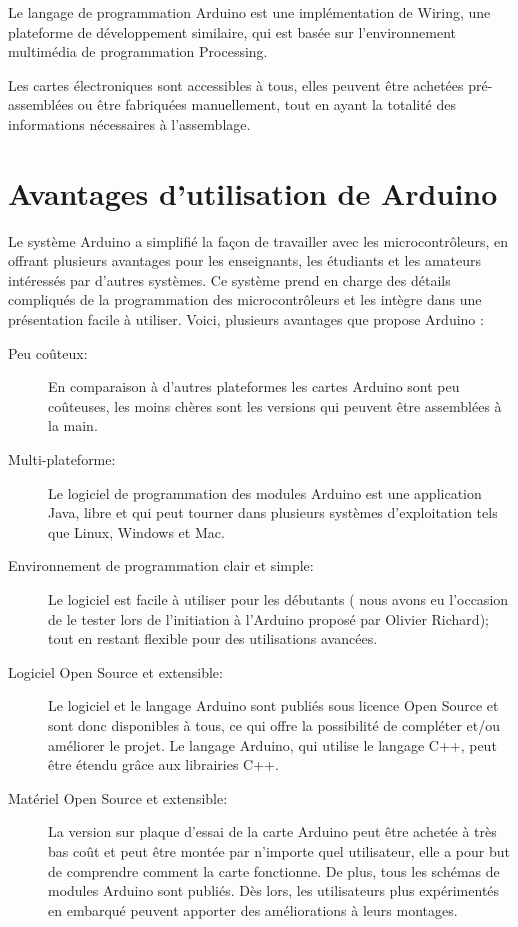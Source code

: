 Le langage de programmation Arduino est une implémentation de Wiring, une plateforme de développement similaire, qui est basée sur l'environnement
multimédia de programmation Processing.

Les cartes électroniques sont accessibles à tous, elles peuvent être achetées pré-assemblées ou être fabriquées manuellement, tout en ayant la totalité des
informations nécessaires à l'assemblage.

\section{Avantages d'utilisation de Arduino}

Le système Arduino a simplifié la façon de travailler avec les microcontrôleurs, en offrant plusieurs avantages pour les enseignants, les étudiants et
les amateurs intéressés par d'autres systèmes. Ce système prend en charge des détails compliqués de la programmation des microcontrôleurs et les intègre
dans une présentation facile à utiliser. Voici, plusieurs avantages que propose Arduino :

\begin{description}
 \item[Peu coûteux:] En comparaison à d'autres plateformes les cartes Arduino sont peu coûteuses, les moins chères sont les versions qui peuvent être
assemblées à la main.
 \item[Multi-plateforme:] Le logiciel de programmation des modules Arduino est une application Java, libre et qui peut tourner dans plusieurs systèmes
d'exploitation tels que Linux, Windows et Mac.
 \item[Environnement de programmation clair et simple:] Le logiciel est facile à utiliser pour les débutants ( nous avons eu l'occasion de le tester lors de
l'initiation à l'Arduino proposé par Olivier Richard); tout en restant flexible pour des utilisations avancées.
 \item[Logiciel Open Source et extensible:] Le logiciel et le langage Arduino sont publiés sous licence Open Source et sont donc disponibles à tous, ce qui
offre la possibilité de compléter et/ou améliorer le projet. Le langage Arduino, qui utilise le langage C++, peut être étendu grâce aux librairies C++.
 \item[Matériel Open Source et extensible:] La version sur plaque d'essai de la carte Arduino peut être achetée à très bas coût et peut être montée par
n'importe quel utilisateur, elle a pour but de comprendre comment la carte fonctionne. De plus, tous les schémas de modules Arduino sont publiés. Dès lors, les
utilisateurs plus expérimentés en embarqué peuvent apporter des améliorations à leurs montages.
\end{description}


